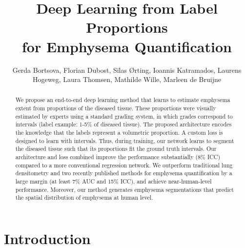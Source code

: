 \documentclass{llncs}
\begin{document}
\mainmatter              %
\title{Deep Learning from Label Proportions \\
for Emphysema Quantification}
\author{
Gerda Bortsova,
Florian Dubost,
Silas {\O}rting,
Ioannis Katramados,
Laurens Hogeweg,
Laura Thomsen,
Mathilde Wille,
Marleen de Bruijne
}
\tocauthor{}

\maketitle              %

\begin{abstract}
We propose an end-to-end deep learning method that learns to estimate emphysema extent from proportions of the diseased tissue.
These proportions were visually estimated by experts using a standard grading system, in which grades correspond to intervals (label example: 1-5\% of diseased tissue).
The proposed architecture encodes the knowledge that the labels represent a volumetric proportion.
A custom loss is designed to learn with intervals.
Thus, during training, our network learns to segment the diseased tissue such that its proportions fit the ground truth intervals.
Our architecture and loss combined improve the performance substantially (8\% ICC) compared to a more conventional regression network.
We outperform traditional lung densitometry and two recently published methods for emphysema quantification by a large margin (at least 7\% AUC and 15\% ICC), and achieve near-human-level performance.
Moreover, our method generates emphysema segmentations that predict the spatial distribution of emphysema at human level.

\end{abstract}
\section{Introduction}
\end{document}
